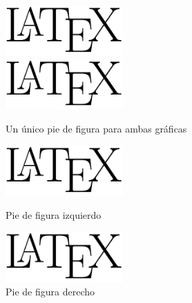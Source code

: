 \documentclass[12pt]{article}
\begin{document}
	\begin{figure}[h]
		\begin{minipage}{0.5\linewidth}
			\begin{center}
				\includegraphics[width=0.4\textwidth]{latex_logo.png}
			\end{center}
		\end{minipage}
		\begin{minipage}{0.5\linewidth}
			\begin{center}
				\includegraphics[width=0.4\textwidth]{latex_logo.png}
			\end{center}
		\end{minipage}
		\caption{Un único pie de figura para ambas gráficas}
		\vspace{1cm}
		\begin{minipage}{0.5\linewidth}
			\begin{center}
				\includegraphics[width=0.4\textwidth]{latex_logo.png}
				\caption{Pie de figura izquierdo}
			\end{center}
		\end{minipage}
		\begin{minipage}{0.5\linewidth}
			\begin{center}
				\includegraphics[width=0.4\textwidth]{latex_logo.png}
				\caption{Pie de figura derecho}
			\end{center}
		\end{minipage}
	\end{figure}
\end{document}
